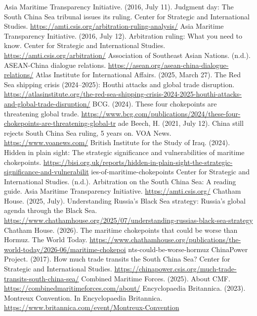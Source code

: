 
\begin{referencelist}
   Asia Maritime Transparency Initiative. (2016, July 11). Judgment day: The South China Sea tribunal issues its ruling. Center for Strategic and International Studies. \url{https://amti.csis.org/arbitration-ruling-analysis/}
   Asia Maritime Transparency Initiative. (2016, July 12). Arbitration ruling: What you need to know. Center for Strategic and International Studies. \url{https://amti.csis.org/arbitration/}
   Association of Southeast Asian Nations. (n.d.). ASEAN-China dialogue relations. \url{https://asean.org/asean-china-dialogue-relations/}
   Atlas Institute for International Affairs. (2025, March 27). The Red Sea shipping crisis (2024–2025): Houthi attacks and global trade disruption. \url{https://atlasinstitute.org/the-red-sea-shipping-crisis-2024-2025-houthi-attacks-and-global-trade-disruption/}
   BCG. (2024). These four chokepoints are threatening global trade. \url{https://www.bcg.com/publications/2024/these-four-chokepoints-are-threatening-global-tr} ade
   Beech, H. (2021, July 12). China still rejects South China Sea ruling, 5 years on. VOA News. \url{https://www.voanews.com/}
   British Institute for the Study of Iraq. (2024). Hidden in plain sight: The strategic significance and vulnerabilities of maritime chokepoints. \url{https://bisi.org.uk/reports/hidden-in-plain-sight-the-strategic-significance-and-vulnerabilit} ies-of-maritime-chokepoints
   Center for Strategic and International Studies. (n.d.). Arbitration on the South China Sea: A reading guide. Asia Maritime Transparency Initiative. \url{https://amti.csis.org/}
   Chatham House. (2025, July). Understanding Russia's Black Sea strategy: Russia's global agenda through the Black Sea. \url{https://www.chathamhouse.org/2025/07/understanding-russias-black-sea-strategy}
   Chatham House. (2026). The maritime chokepoints that could be worse than Hormuz. The World Today. \url{https://www.chathamhouse.org/publications/the-world-today/2026-06/maritime-chokepoi} nts-could-be-worse-hormuz
   ChinaPower Project. (2017). How much trade transits the South China Sea? Center for Strategic and International Studies. \url{https://chinapower.csis.org/much-trade-transits-south-china-sea/}
   Combined Maritime Forces. (2025). About CMF. \url{https://combinedmaritimeforces.com/about/}
   Encyclopaedia Britannica. (2023). Montreux Convention. In Encyclopaedia Britannica. \url{https://www.britannica.com/event/Montreux-Convention}

\end{referencelist}
